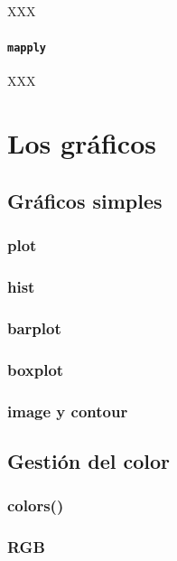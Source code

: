 \documentclass[]{book}
\begin{document}
XXX

\subsection{\texorpdfstring{\texttt{mapply}}{mapply}}\label{mapply}

XXX

\part{Los gráficos}\label{part-los-graficos}

\chapter{Gráficos simples}\label{graph1}

\section{plot}\label{plot}

\section{hist}\label{hist}

\section{barplot}\label{barplot}

\section{boxplot}\label{boxplot}

\section{image y contour}\label{image-y-contour}

\chapter{Gestión del color}\label{graph2}

\section{colors()}\label{colors}

\section{RGB}\label{rgb}
\end{document}
